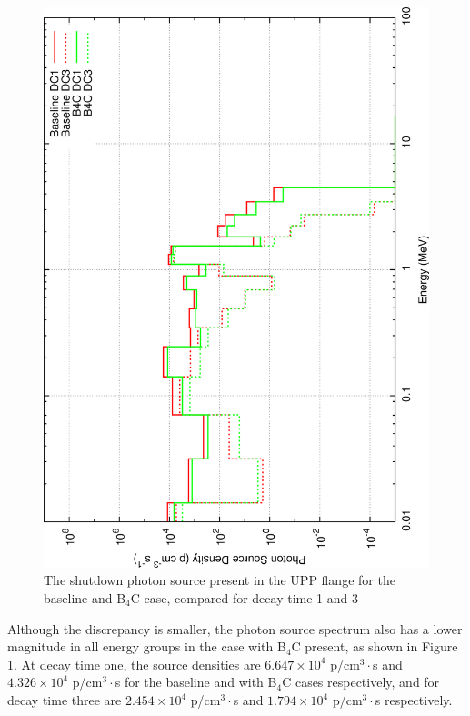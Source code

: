 \documentclass[12pt]{article}
\begin{document}
\begin{figure}[ht!]
  \centering
  \includegraphics[angle=-90,clip,scale=0.15]{../plots/source_comparison/upp_flange_spectra.png}     
  \caption{The shutdown photon source present in the UPP flange for the baseline and B$_4$C case, compared 
  for decay time 1 and 3}
  \label{fig:src_spectra_upp}
\end{figure}

Although the discrepancy is smaller, the photon source spectrum also has a
lower magnitude in all energy groups in the case with B$_4$C present, as
shown in Figure \ref{fig:src_spectra_upp}. At decay time one, the source densities are 
$6.647\times10^4$ p/cm$^3\cdot$s and  $4.326\times10^4$ p/cm$^3\cdot$s for the baseline and with B$_4$C 
cases respectively, and for decay time three are  $2.454\times10^4$ p/cm$^3\cdot$s and 
$1.794\times10^4$ p/cm$^3\cdot$s respectively.
\end{document}
